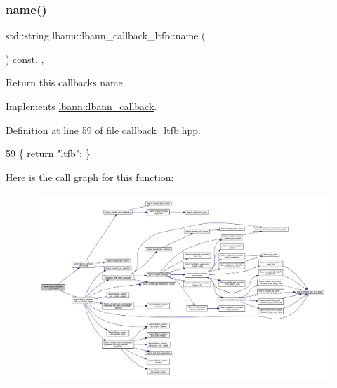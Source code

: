\subsubsection{\texorpdfstring{name()}{name()}}
{\footnotesize\ttfamily std\+::string lbann\+::lbann\+\_\+callback\+\_\+ltfb\+::name (\begin{DoxyParamCaption}{ }\end{DoxyParamCaption}) const\hspace{0.3cm}{\ttfamily [inline]}, {\ttfamily [override]}, {\ttfamily [virtual]}}

Return this callback\textquotesingle{}s name. 

Implements \hyperlink{classlbann_1_1lbann__callback_a7522c7a14f1d6a1ea762cc2d7248eb3a}{lbann\+::lbann\+\_\+callback}.



Definition at line 59 of file callback\+\_\+ltfb.\+hpp.


\begin{DoxyCode}
59 \{ \textcolor{keywordflow}{return} \textcolor{stringliteral}{"ltfb"}; \}
\end{DoxyCode}
Here is the call graph for this function\+:\nopagebreak
\begin{figure}[H]
\begin{center}
\leavevmode
\includegraphics[width=350pt]{classlbann_1_1lbann__callback__ltfb_aaf259b187e956282807d4daa03beb502_cgraph}
\end{center}
\end{figure}
\mbox{\label{classlbann_1_1lbann__callback__ltfb_a7d2d1682c4a6a6b7e8ea1e3f4bf33c84}} 
